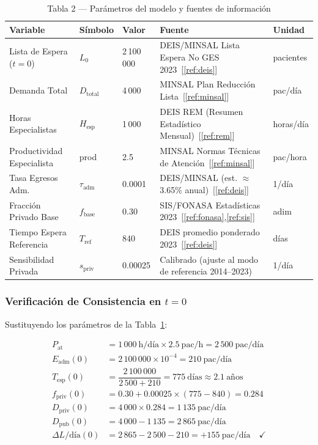 \documentclass[12pt,a4paper]{article}
\begin{document}
\begin{table}[H]
\centering
\caption{Tabla 2 — Parámetros del modelo y fuentes de información}
\label{tab:parametros}
\begin{tabularx}{\textwidth}{@{}p{4.5cm}p{2cm}p{1.5cm}Xp{2.5cm}@{}}
\toprule
\rowcolor{azulDS!15}
\textbf{Variable} & \textbf{Símbolo} & \textbf{Valor} & \textbf{Fuente} & \textbf{Unidad} \\
\midrule
Lista de Espera ($t{=}0$) & $L_0$ & 2\,100\,000 &
  DEIS/MINSAL Lista Espera No GES 2023~[\ref{ref:deis}] & pacientes \\[3pt]
Demanda Total & $D_{\text{total}}$ & 4\,000 &
  MINSAL Plan Reducción Lista~[\ref{ref:minsal}] & pac/día \\[3pt]
Horas Especialistas & $H_{\text{esp}}$ & 1\,000 &
  DEIS REM (Resumen Estadístico Mensual)~[\ref{ref:rem}] & horas/día \\[3pt]
Productividad Especialista & prod & 2.5 &
  MINSAL Normas Técnicas de Atención~[\ref{ref:minsal}] & pac/hora \\[3pt]
Tasa Egresos Adm. & $\tau_{\text{adm}}$ & 0.0001 &
  DEIS/MINSAL (est. $\approx$3.65\% anual)~[\ref{ref:deis}] & 1/día \\[3pt]
Fracción Privado Base & $f_{\text{base}}$ & 0.30 &
  SIS/FONASA Estadísticas 2023~[\ref{ref:fonasa},\ref{ref:sis}] & adim \\[3pt]
Tiempo Espera Referencia & $T_{\text{ref}}$ & 840 &
  DEIS promedio ponderado 2023~[\ref{ref:deis}] & días \\[3pt]
Sensibilidad Privada & $s_{\text{priv}}$ & 0.00025 &
  Calibrado (ajuste al modo de referencia 2014--2023) & 1/día \\
\bottomrule
\end{tabularx}
\end{table}

\subsubsection*{Verificación de Consistencia en $t=0$}

Sustituyendo los parámetros de la Tabla~\ref{tab:parametros}:

\begin{align*}
P_{\text{at}} &= 1\,000\ \text{h/día} \times 2.5\ \text{pac/h} = 2\,500\ \text{pac/día}\\
E_{\text{adm}}(0) &= 2\,100\,000 \times 10^{-4} = 210\ \text{pac/día}\\
T_{\text{esp}}(0) &= \dfrac{2\,100\,000}{2\,500+210} = 775\ \text{días} \approx 2.1\ \text{años}\\
f_{\text{priv}}(0) &= 0.30 + 0.00025\times(775-840) = 0.284\\
D_{\text{priv}}(0) &= 4\,000 \times 0.284 = 1\,135\ \text{pac/día}\\
D_{\text{pub}}(0)  &= 4\,000 - 1\,135 = 2\,865\ \text{pac/día}\\
\Delta L/\text{día}(0) &= 2\,865 - 2\,500 - 210 = +155\ \text{pac/día} \quad \checkmark
\end{align*}
\end{document}
